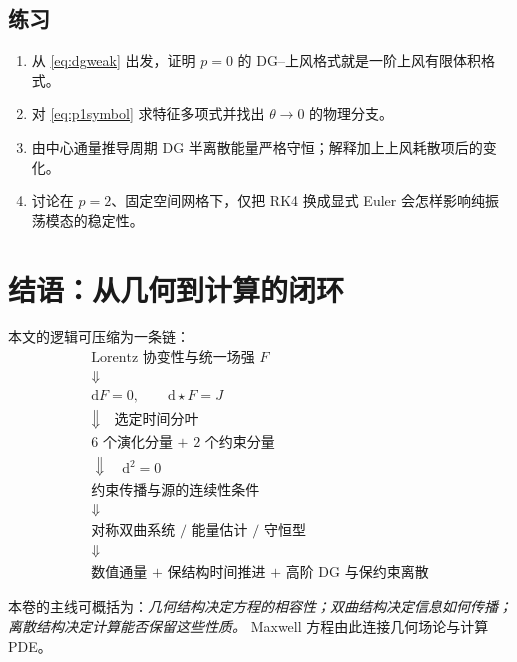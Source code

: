 \documentclass[UTF8,11pt,openany]{ctexbook}
\numberwithin{equation}{chapter}
\theoremstyle{definition}
\theoremstyle{remark}
\newcommand{\dd}{\mathrm d}
\begin{document}
\section{练习}
\begin{enumerate}
\item 从 \eqref{eq:dgweak} 出发，证明 $p=0$ 的 DG--上风格式就是一阶上风有限体积格式。
\item 对 \eqref{eq:p1symbol} 求特征多项式并找出 $\theta\to0$ 的物理分支。
\item 由中心通量推导周期 DG 半离散能量严格守恒；解释加上上风耗散项后的变化。
\item 讨论在 $p=2$、固定空间网格下，仅把 RK4 换成显式 Euler 会怎样影响纯振荡模态的稳定性。
\end{enumerate}

\chapter*{结语：从几何到计算的闭环}
本文的逻辑可压缩为一条链：
\begin{equation*}
\boxed{
\begin{gathered}
\text{Lorentz 协变性与统一场强 }F\\
\Downarrow\\
\dd F=0,\qquad \dd\star F=J\\
\Downarrow\quad\text{选定时间分叶}\\
\text{6 个演化分量 + 2 个约束分量}\\
\Downarrow\quad\dd^2=0\\
\text{约束传播与源的连续性条件}\\
\Downarrow\\
\text{对称双曲系统 / 能量估计 / 守恒型}\\
\Downarrow\\
\text{数值通量 + 保结构时间推进 + 高阶 DG 与保约束离散}
\end{gathered}}
\end{equation*}

本卷的主线可概括为：\emph{几何结构决定方程的相容性；双曲结构决定信息如何传播；离散结构决定计算能否保留这些性质。} Maxwell 方程由此连接几何场论与计算 PDE。

\appendix
\end{document}
